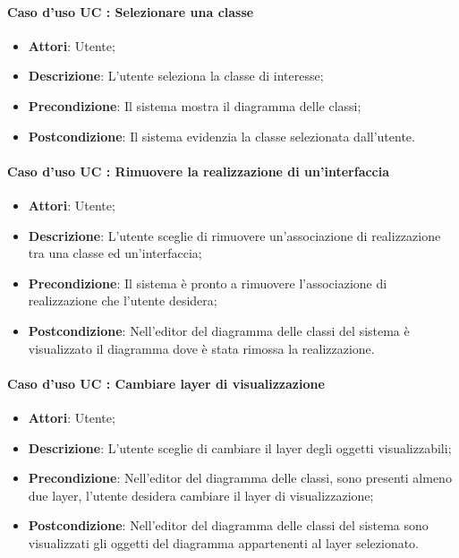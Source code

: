 \documentclass[../AnalisiDeiRequisiti.tex]{subfiles}
\begin{document}
		\paragraph{Caso d'uso UC : Selezionare una classe}
			\begin{itemize}
				\item \textbf{Attori}: Utente;
				\item \textbf{Descrizione}: L'utente seleziona la classe di interesse;
				\item \textbf{Precondizione}: Il sistema mostra il diagramma delle classi;
				\item \textbf{Postcondizione}: Il sistema evidenzia la classe selezionata
				dall'utente.
			\end{itemize}
		\paragraph{Caso d'uso UC : Rimuovere la realizzazione di un'interfaccia}
			\begin{itemize}
				\item \textbf{Attori}: Utente;
				\item \textbf{Descrizione}: L'utente sceglie di rimuovere un'associazione di
				realizzazione tra una classe ed un'interfaccia;
				\item \textbf{Precondizione}: Il sistema è pronto a rimuovere l'associazione
				di realizzazione che l'utente desidera;
				\item \textbf{Postcondizione}: Nell'editor del diagramma delle classi del
				sistema è visualizzato il diagramma dove è stata rimossa la realizzazione.
			\end{itemize}
			
		\paragraph{Caso d'uso UC : Cambiare layer di visualizzazione}
			\begin{itemize}
				\item \textbf{Attori}: Utente;
				\item \textbf{Descrizione}: L'utente sceglie di cambiare il layer degli
				oggetti visualizzabili;
				\item \textbf{Precondizione}: Nell'editor del diagramma delle classi, sono
				presenti almeno due layer, l'utente desidera cambiare il layer di
				visualizzazione;
				\item \textbf{Postcondizione}: Nell'editor del diagramma delle classi del
				sistema sono visualizzati gli oggetti del diagramma appartenenti al layer
				selezionato.
			\end{itemize}
			
\end{document}
